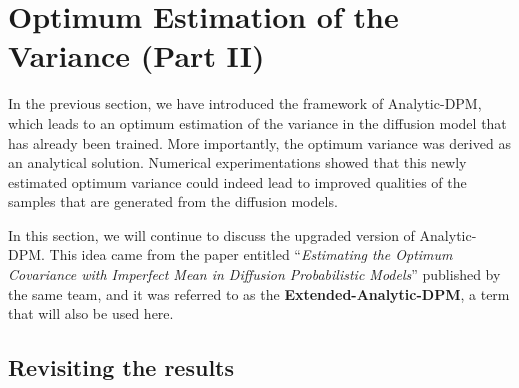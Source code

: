\section{Optimum Estimation of the Variance (Part II)}\label{sect8:variance_II}

In the previous section, we have introduced the framework of Analytic-DPM, which leads to an optimum estimation of the variance in the diffusion model that has already been trained. More importantly, the optimum variance was derived as an analytical solution. Numerical experimentations showed that this newly estimated optimum variance could indeed lead to improved qualities of the samples that are generated from the diffusion models. 

In this section, we will continue to discuss the upgraded version of Analytic-DPM. This idea came from the paper entitled ``\emph{Estimating the Optimum Covariance with Imperfect Mean in Diffusion Probabilistic Models}''\cite{bao2022estimating} published by the same team, and it was referred to as the \textbf{Extended-Analytic-DPM}, a term that will also be used here.

\subsection{Revisiting the results}

